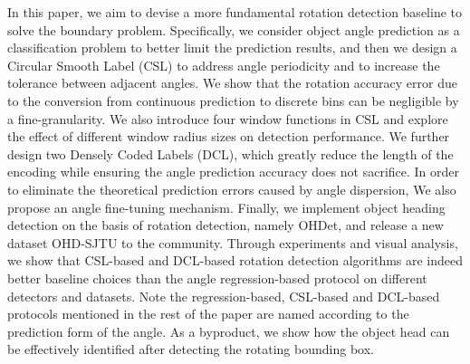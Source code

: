 \documentclass[10pt,journal,compsoc]{IEEEtran}
\begin{document}
In this paper, we aim to devise a more fundamental rotation detection baseline to solve the boundary problem. Specifically, we consider object angle prediction as a classification problem to better limit the prediction results, and then we design a Circular Smooth Label (CSL) to address angle periodicity and to increase the tolerance between adjacent angles. We show that the rotation accuracy error due to the conversion from continuous prediction to discrete bins can be negligible by a fine-granularity. We also introduce four window functions in CSL and explore the effect of different window radius sizes on detection performance. We further design two Densely Coded Labels (DCL), which greatly reduce the length of the encoding while ensuring the angle prediction accuracy does not sacrifice. In order to eliminate the theoretical prediction errors caused by angle dispersion, We also propose an angle fine-tuning mechanism.
Finally, we implement object heading detection on the basis of rotation detection, namely OHDet, and release a new dataset OHD-SJTU to the community. Through experiments and visual analysis, we show that CSL-based and DCL-based rotation detection algorithms are indeed better baseline choices than the angle regression-based protocol on different detectors and datasets. Note the regression-based, CSL-based and DCL-based protocols mentioned in the rest of the paper are named according to the prediction form of the angle. As a byproduct, we show how the object head can be effectively identified after detecting the rotating bounding box.
\end{document}
